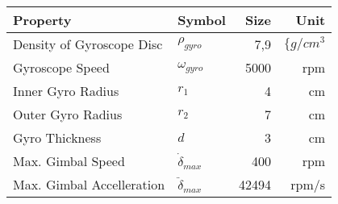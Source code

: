 \documentclass{standalone}
\begin{document}
\begin{tabular}{llrr}\toprule
    \textbf{Property}
        & \textbf{Symbol}
        & \textbf{Size}
        & \textbf{Unit}\\
    \midrule
    Density of Gyroscope Disc & $\rho_{gyro}$ & 7,9 & $\{g/cm^3$ \\
    Gyroscope Speed & $\omega_{gyro}$ & 5000 & rpm \\
    Inner Gyro Radius & $r_1$ & 4 & cm \\
    Outer Gyro Radius & $r_2$ & 7 & cm \\
    Gyro Thickness & $d$ & 3 & cm \\
    Max. Gimbal Speed & $\dot{\delta}_{max}$ & 400 & rpm \\
    Max. Gimbal Accelleration & $\ddot{\delta}_{max}$ & 42494 & rpm/s \\
    \bottomrule
\end{tabular}
\end{document}

